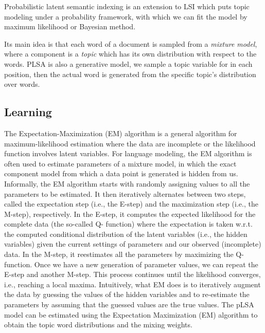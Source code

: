 Probabilistic latent semantic indexing\cite{hofmann1999probabilistic} is an extension to LSI which puts topic modeling under a probability framework, with which we can fit the model by maximum likelihood or Bayesian method.

Its main idea is that each word of a document is sampled from a \emph{mixture model}, where a component is a \emph{topic} which has its own distribution with respect to the words. PLSA is also a generative model, we sample a topic variable for in each position, then the actual word is generated from the specific topic's distribution over words. 

\subsection{Learning}
The Expectation-Maximization (EM) algorithm is a general algorithm for maximum-likelihood estimation where the data are incomplete or the likelihood function involves latent variables. For language modeling, the EM algorithm is often used to estimate parameters of a mixture model, in which the exact component model from which a data point is generated is hidden from us. Informally, the EM algorithm starts with randomly assigning values to all the parameters to be estimated. It then iteratively alternates between two steps, called the expectation step (i.e., the E-step) and the maximization step (i.e., the M-step), respectively. In the E-step, it computes the expected likelihood for the complete data (the so-called Q- function) where the expectation is taken w.r.t. the computed conditional distribution of the latent variables (i.e., the hidden variables) given the current settings of parameters and our observed (incomplete) data. In the M-step, it reestimates all the parameters by maximizing the Q-function. Once we have a new generation of parameter values, we can repeat the E-step and another M-step. This process continues until the likelihood converges, i.e., reaching a local maxima. Intuitively, what EM does is to iteratively augment the data by guessing the values of the hidden variables and to re-estimate the parameters by assuming that the guessed values are the true values. \cite{dempster1977maximum}
The pLSA model can be estimated using the Expectation Maximization (EM) algorithm \cite{mei2001note} to obtain the topic word distributions and the mixing weights. 

